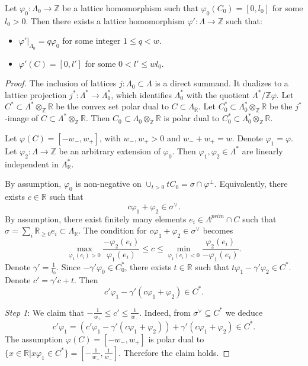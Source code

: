 \documentclass[10pt,a4paper]{amsart}
\newcommand{\R}{{\mathbb R}}
\newcommand{\Z}{{\mathbb Z}}
\begin{document}
\begin{prop}\label{extpofcn}
	Let $\varphi_0\colon \Lambda_0\to \Z$ be a lattice homomorphism such that
	$\varphi_0(C_0)=[0,l_0]$ for some $l_0>0$. Then there exists a lattice
	homomorphism $\varphi'\colon \Lambda\to \Z$ such that:
	\begin{itemize}
		\item $\varphi'|_{\Lambda_0}=q\varphi_0$ for some integer $1\le q< w$.
		\item $\varphi'(C)=[0,l']$ for some $0<l'\le wl_0$.
	\end{itemize}
\end{prop}

\begin{proof} The inclusion of lattices $j\colon \Lambda_0\subset \Lambda$ is a direct
	summand. It dualizes to a lattice projection $j^*\colon \Lambda^*\to \Lambda_0^*$,
	which identifies $\Lambda_0^*$ with the quotient $\Lambda^*/\Z \varphi$. 
	Let $C^*\subset \Lambda^*\otimes_\Z \R$ be the convex set polar dual to $C\subset \Lambda_\R$. 
	Let $C^*_0\subset \Lambda_0^*\otimes_\Z \R$ be the $j^*$-image of 
	$C\subset \Lambda^*\otimes_\Z \R$. Then $C_0\subset \Lambda_0\otimes_\Z \R$ is polar 
	dual to $C_0^*\subset \Lambda^*_0\otimes_\Z \R$. 
	
	Let $\varphi(C)=[-w_-,w_+]$, with $w_-,w_+>0$ and $w_-+w_+=w$.
	Denote $\varphi_1=\varphi$. Let $\varphi_2\colon \Lambda\to \Z$ be an arbitrary extension of 
	$\varphi_0$. Then $\varphi_1,\varphi_2\in \Lambda^*$ are linearly independent in $\Lambda^*_\R$.
	
	 By assumption, $\varphi_0$ is non-negative 
    on $\cup_{t>0}tC_0=\sigma\cap \varphi^\perp$. Equivalently, there exists $c\in \R$ such that 
	$$
	c\varphi_1+\varphi_2\in \sigma^\vee.
	$$
	By assumption, there exist finitely many elements $e_i \in \Lambda^{prim}\cap C$ such that
	$\sigma=\sum_i\R_{\ge 0}e_i\subset \Lambda_\R$. The condition for $c\varphi_1+\varphi_2\in \sigma^\vee$ 
	becomes
	$$
	\max_{\varphi_1(e_i)>0}\frac{-\varphi_2(e_i)}{\varphi_1(e_i)}\le c\le
	\min_{\varphi_1(e_i)<0}\frac{\varphi_2(e_i)}{-\varphi_1(e_i)}.
	$$
	Denote $\gamma'=\frac{1}{l_0}$. 
	Since $-\gamma'\varphi_0 \in C^*_0$, there exists $t\in \R$ such that 
	$t\varphi_1-\gamma'\varphi_2\in C^*$. Denote $c'=\gamma'c+t$. Then 
	$$
	c'\varphi_1-\gamma'(c\varphi_1+\varphi_2)\in C^*.
	$$
	
	{\em Step 1}: We claim that $-\frac{1}{w_+}\le c'\le \frac{1}{w_-}$. Indeed, from $\sigma^\vee\subseteq C^*$
	we deduce
	 $$
	c'\varphi_1=
	(c'\varphi_1-\gamma'(c\varphi_1+\varphi_2))+\gamma'(c\varphi_1+\varphi_2)
	\in C^*.
	$$
	The assumption $\varphi(C)=[-w_-,w_+]$ is polar dual to 
	$\{x\in \R | x \varphi_1\in C^* \}=[-\frac{1}{w_+},\frac{1}{w_-}]$. Therefore the claim holds.
	

\end{proof}
\end{document}
